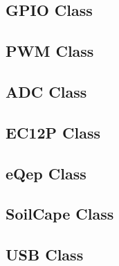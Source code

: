 \documentclass[11pt,fleqn,,a4paper,twoside,openright]{book}
\begin{document}
\subsection*{GPIO Class}


\newpage
\subsection*{PWM Class}


\newpage
\subsection*{ADC Class}


\newpage
\subsection*{EC12P Class}


\newpage
\subsection*{eQep Class}


\newpage
\subsection*{SoilCape Class}


\newpage
\subsection*{USB Class}


\newpage
\end{document}
